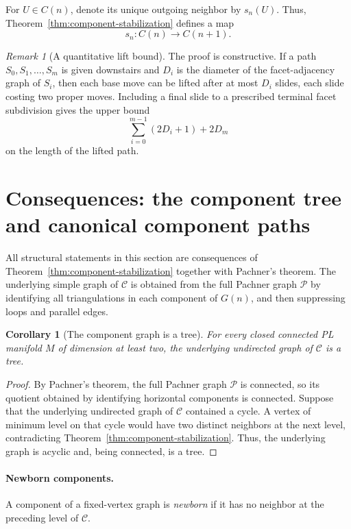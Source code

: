 \documentclass[11pt]{article}
\newtheorem{corollary}[theorem]{Corollary}
\theoremstyle{remark}
\newtheorem{remark}[theorem]{Remark}
\theoremstyle{plain}
\begin{document}
For \(U\in C(n)\), denote its unique outgoing neighbor by \(s_n(U)\).  Thus,
Theorem~\ref{thm:component-stabilization} defines a map
\[
 s_n:C(n)\longrightarrow C(n+1).
\]

\begin{remark}[A quantitative lift bound]
The proof is constructive.  If a path
\(S_0,S_1,\ldots,S_m\) is given downstairs and \(D_i\) is the diameter of
the facet-adjacency graph of \(S_i\), then each base move can be lifted after
at most \(D_i\) slides, each slide costing two proper moves.  Including a
final slide to a prescribed terminal facet subdivision gives the upper bound
\[
 \sum_{i=0}^{m-1}(2D_i+1)+2D_m
\]
on the length of the lifted path.
\end{remark}

\section{Consequences: the component tree and canonical component paths}
\label{sec:tree}

All structural statements in this section are consequences of
Theorem~\ref{thm:component-stabilization} together with Pachner's theorem.
The underlying simple graph of \(\mathcal C\) is obtained from the full
Pachner graph \(\mathcal P\) by identifying all triangulations in each
component of \(G(n)\), and then suppressing loops and parallel edges.

\begin{corollary}[The component graph is a tree]
\label{cor:component-tree}
For every closed connected PL manifold \(M\) of dimension at least two, the
underlying undirected graph of \(\mathcal C\) is a tree.
\end{corollary}

\begin{proof}
By Pachner's theorem, the full Pachner graph \(\mathcal P\) is connected, so
its quotient obtained by identifying horizontal components is connected.
Suppose that the underlying undirected graph of \(\mathcal C\) contained a
cycle.  A vertex of minimum level on that cycle would have two distinct
neighbors at the next level, contradicting
Theorem~\ref{thm:component-stabilization}.  Thus, the underlying graph is
acyclic and, being connected, is a tree.
\end{proof}

\paragraph{Newborn components.}
A component of a fixed-vertex graph is \emph{newborn} if it has no neighbor at
the preceding level of \(\mathcal C\).
\end{document}
